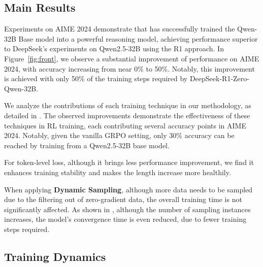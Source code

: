 \subsection{Main Results}

Experiments on AIME 2024 demonstrate that \method has successfully trained the Qwen-32B Base model into a powerful reasoning model, achieving performance superior to DeepSeek's experiments on Qwen2.5-32B using the R1 approach.
In Figure~\ref{fig:front}, we observe a substantial improvement of performance on AIME 2024, with accuracy increasing from near $0$\% to 50\%. Notably, this improvement is achieved with only 50\% of the training steps required by DeepSeek-R1-Zero-Qwen-32B.

We analyze the contributions of each training technique in our methodology, as detailed in .
The observed improvements demonstrate the effectiveness of these techniques in RL training, each contributing several accuracy points in AIME 2024.
Notably, given the vanilla GRPO setting, only 30\% accuracy can be reached by training from a Qwen2.5-32B base model.

For token-level loss, although it brings less performance improvement, we find it enhances training stability and makes the length increase more healthily.

When applying \textbf{Dynamic Sampling}, although more data needs to be sampled due to the filtering out of zero-gradient data, the overall training time is not significantly affected.
As shown in , although the number of sampling instances increases, the model's convergence time is even reduced, due to fewer training steps required.



\subsection{Training Dynamics}

